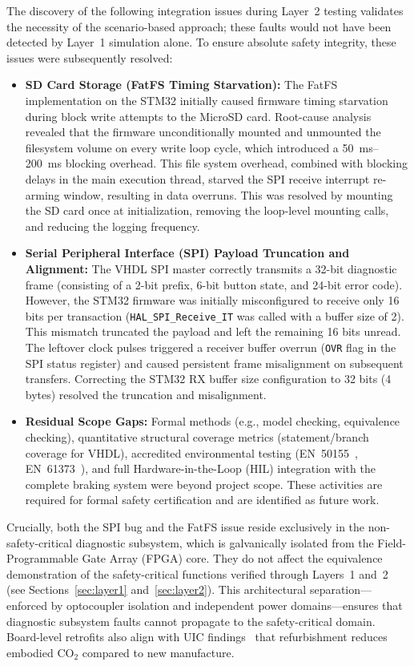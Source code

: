 \documentclass[journal, a4paper]{IEEEtran}
\newif\iffirstFPGA  \firstFPGAtrue
\newcommand{\FPGA}{\iffirstFPGA Field-Programmable Gate Array (FPGA)\global\firstFPGAfalse\else FPGA\fi}
\newif\iffirstSPI   \firstSPItrue
\newcommand{\SPI}{\iffirstSPI Serial Peripheral Interface (SPI)\global\firstSPIfalse\else SPI\fi}
\newif\iffirstHIL   \firstHILtrue
\newcommand{\HIL}{\iffirstHIL Hardware-in-the-Loop (HIL)\global\firstHILfalse\else HIL\fi}
\begin{document}
The discovery of the following integration issues during Layer~2 testing validates the necessity of the scenario-based approach; these faults would not have been detected by Layer~1 simulation alone. To ensure absolute safety integrity, these issues were subsequently resolved:
\begin{itemize}[nosep]
  \item \textbf{SD Card Storage (FatFS Timing Starvation):} The FatFS implementation on the STM32 initially caused firmware timing starvation during block write attempts to the MicroSD card. Root-cause analysis revealed that the firmware unconditionally mounted and unmounted the filesystem volume on every write loop cycle, which introduced a \SIrange{50}{200}{\milli\second} blocking overhead. This file system overhead, combined with blocking delays in the main execution thread, starved the SPI receive interrupt re-arming window, resulting in data overruns. This was resolved by mounting the SD card once at initialization, removing the loop-level mounting calls, and reducing the logging frequency.
  \item \textbf{\SPI{} Payload Truncation and Alignment:} The VHDL SPI master correctly transmits a 32-bit diagnostic frame (consisting of a 2-bit prefix, 6-bit button state, and 24-bit error code). However, the STM32 firmware was initially misconfigured to receive only 16 bits per transaction (\texttt{HAL\_SPI\_Receive\_IT} was called with a buffer size of 2). This mismatch truncated the payload and left the remaining 16 bits unread. The leftover clock pulses triggered a receiver buffer overrun (\texttt{OVR} flag in the SPI status register) and caused persistent frame misalignment on subsequent transfers. Correcting the STM32 RX buffer size configuration to 32 bits (4 bytes) resolved the truncation and misalignment.
  \item \textbf{Residual Scope Gaps:} Formal methods (e.g., model checking, equivalence checking), quantitative structural coverage metrics (statement/branch coverage for VHDL), accredited environmental testing (EN~50155~\cite{en50155_2021}, EN~61373~\cite{en61373_2010}), and full \HIL{} integration with the complete braking system were beyond project scope. These activities are required for formal safety certification and are identified as future work.
\end{itemize}

Crucially, both the SPI bug and the FatFS issue reside exclusively in the non-safety-critical diagnostic subsystem, which is galvanically isolated from the \FPGA{} core. They do not affect the equivalence demonstration of the safety-critical functions verified through Layers~1 and~2 (see Sections~\ref{sec:layer1} and~\ref{sec:layer2}). This architectural separation---enforced by optocoupler isolation and independent power domains---ensures that diagnostic subsystem faults cannot propagate to the safety-critical domain. Board-level retrofits also align with UIC findings~\cite{carbon_infra_uic_2016} that refurbishment reduces embodied CO$_2$ compared to new manufacture.
\end{document}
